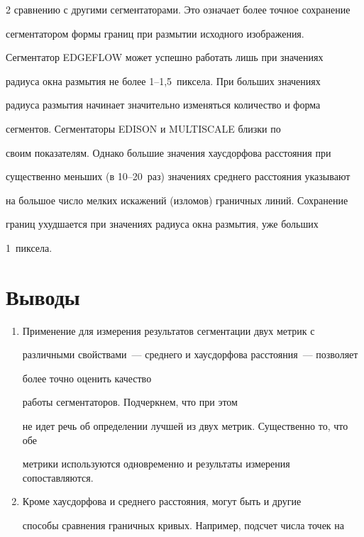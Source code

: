 \begin{multicols}{2}
сравнению с другими сегментаторами. Это означает более точное сохранение 


сегментатором формы границ при размытии исходного изображения. 


Сегментатор {EDGEFLOW} может успешно работать лишь при значениях 


радиуса окна размытия не более 1--1,5~пиксела. При больших значениях 


радиуса размытия начинает значительно изменяться количество и форма 


сегментов. Сегментаторы {EDISON} и {MULTISCALE} близки по 


своим показателям. Однако большие значения хаусдорфова расстояния при 


существенно меньших (в 10--20~раз) значениях среднего расстояния указывают 


на большое число мелких искажений (изломов) граничных линий. Сохранение 


границ ухудшается при значениях радиуса окна размытия, уже больших 


1~пиксела.


 


  \section{Выводы}


  


  \noindent


  \begin{enumerate}[1.]


  \item Применение для измерения результатов сегментации двух метрик с 


различными свойствами~--- среднего и хаусдорфова расстояния~--- позволяет 


более точно оценить качество\linebreak


работы сегментаторов. Подчеркнем, что при этом 


не идет речь об определении лучшей из двух метрик. Существенно то, что обе 


метрики используются одновременно и результаты измерения сопоставляются.


  \item  Кроме хаусдорфова и среднего расстояния, могут быть и другие 


способы сравнения граничных кривых. Например, подсчет числа точек на 



\end{enumerate}
\end{multicols}
